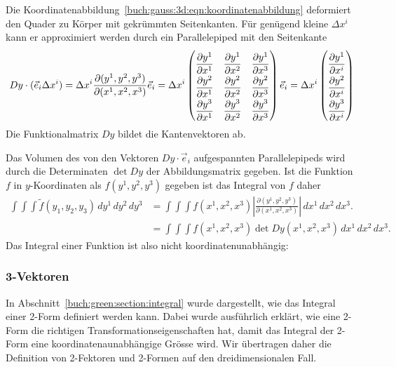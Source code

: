 Die Koordinatenabbildung~\eqref{buch:gauss:3d:eqn:koordinatenabbildung}
deformiert den Quader zu Körper mit gekrümmten Seitenkanten.
Für genügend kleine $\Delta x^i$ kann er approximiert werden durch
ein Parallelepiped mit den Seitenkante
\[
Dy\cdot(\vec{e}_i\Delta x^i)
=
\Delta x^i
\frac{\partial(y^1,y^2,y^3)}{\partial(x^1,x^2,x^3)}
\vec{e}_i
=
\Delta x^i
\renewcommand{\arraystretch}{2.0}
\begin{pmatrix}
\displaystyle\frac{\partial y^1}{\partial x^1}&
\displaystyle\frac{\partial y^1}{\partial x^2}&
\displaystyle\frac{\partial y^1}{\partial x^3}\\
\displaystyle\frac{\partial y^2}{\partial x^1}&
\displaystyle\frac{\partial y^2}{\partial x^2}&
\displaystyle\frac{\partial y^2}{\partial x^3}\\
\displaystyle\frac{\partial y^3}{\partial x^1}&
\displaystyle\frac{\partial y^3}{\partial x^2}&
\displaystyle\frac{\partial y^3}{\partial x^3}
\end{pmatrix}
\vec{e}_i
=
\Delta x^i
\begin{pmatrix}
\displaystyle\frac{\partial y^1}{\partial x^i}\\
\displaystyle\frac{\partial y^2}{\partial x^i}\\
\displaystyle\frac{\partial y^3}{\partial x^i}\\
\end{pmatrix}
\]
Die Funktionalmatrix $Dy$ bildet die Kantenvektoren ab.

Das Volumen des von den Vektoren $Dy\cdot\vec{e}_i$ aufgespannten
Parallelepipeds wird durch die Determinaten $\det Dy$ der
Abbildungsmatrix gegeben. 
Ist die Funktion $f$ in $y$-Koordinaten als $f(y^1,y^2,y^3)$ gegeben 
ist das Integral von $f$ daher 
\begin{align*}
\int\!\!\!\int\!\!\!\int
\tilde{f}(y_1,y_2,y_3)
\,dy^1
\,dy^2
\,dy^3
&=
\int\!\!\!\int\!\!\!\int
f(x^1,x^2,x^3)
\left|
\frac{\partial (y^1,y^2,y^3)}{\partial(x^1,x^2,x^3)}
\right|
\,dx^1
\,dx^2
\,dx^3.
\\
&=
\int\!\!\!\int\!\!\!\int
f(x^1,x^2,x^3)
\det Dy(x^1,x^2,x^3)
\,dx^1
\,dx^2
\,dx^3.
\end{align*}
Das Integral einer Funktion ist also nicht koordinatenunabhängig:

%
%
\subsubsection{3-Vektoren}
In Abschnitt~\ref{buch:green:section:integral} wurde dargestellt, wie
das Integral einer 2-Form definiert werden kann.
Dabei wurde ausführlich erklärt, wie eine 2-Form die richtigen
Transformationseigenschaften hat, damit das Integral der 2-Form
eine koordinatenaunabhängige Grösse wird.
Wir übertragen daher die Definition von 2-Fektoren und 2-Formen
auf den dreidimensionalen Fall.

